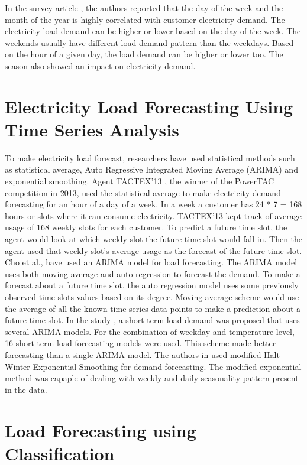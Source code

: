 In the survey article \cite{hahn2009electric}, the authors reported that the day of the week and the month of the year is highly correlated with customer electricity demand. The electricity load demand can be higher or lower based on the day of the week. The weekends usually have different load demand pattern than the weekdays. Based on the hour of a given day, the load demand can be higher or lower too. The season also showed an impact on electricity demand. 

\section{Electricity Load Forecasting Using Time Series Analysis}

To make electricity load forecast, researchers have used statistical methods such as statistical average, Auto Regressive Integrated Moving Average (ARIMA) and exponential smoothing.  Agent TACTEX'13 \cite{urieli2014tactex}, the winner of the PowerTAC competition in 2013, used the statistical average to make electricity demand forecasting for an hour of a day of a week. In a week a customer has 24 * 7 = 168 hours or slots where it can consume electricity. TACTEX'13  kept track of average usage of 168 weekly slots for each customer. To predict a future time slot, the agent would look at which weekly slot the future time slot would fall in. Then the agent used that weekly slot's average usage as the forecast of the future time slot. Cho et al., \cite{cho1995customer} have used an ARIMA model for load forecasting. The ARIMA model uses both moving average and auto regression to forecast the demand. To make a forecast about a future time slot, the auto regression model uses some previously observed time slots values based on its degree. Moving average scheme would use the average of all the known time series data points to make a prediction about a future time slot. In the study \cite{amjady2001short}, a short term load demand was proposed that uses several ARIMA models. For the combination of weekday and temperature level, 16 short term load forecasting models were used. This scheme made better forecasting than a single ARIMA model. The authors in \cite{jalil2013electricity} used modified Halt Winter Exponential Smoothing for demand forecasting. The modified exponential method was capaple of dealing with weekly and daily seasonality pattern present in the data.    


\section{Load Forecasting using Classification}

